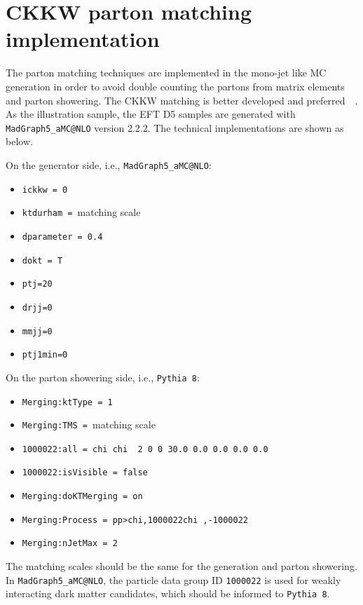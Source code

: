
\section{CKKW parton matching implementation}
\label{sec:monojet_parton_match}

The parton matching techniques are implemented in the mono-jet like MC generation in order to avoid double counting the partons from matrix elements and parton showering. The CKKW matching is better developed and preferred~\cite{Alwall:1405.0301}~\cite{Alwall:0706.2569}. As the illustration sample, the EFT D5 samples are generated with \texttt{MadGraph5\_aMC@NLO} version 2.2.2. The technical implementations are shown as below.

On the generator side, i.e., \texttt{MadGraph5\_aMC@NLO}:
\begin{itemize}
\item \texttt{ickkw = 0}
\item \texttt{ktdurham = }matching scale
\item \texttt{dparameter = 0.4}
\item \texttt{dokt = T}
\item \texttt{ptj=20}
\item \texttt{drjj=0}
\item \texttt{mmjj=0}
\item \texttt{ptj1min=0}
\end{itemize}
On the parton showering side, i.e., \texttt{Pythia 8}:
\begin{itemize}
\item \texttt{Merging:ktType           = 1}
\item \texttt{Merging:TMS              = }matching scale
\item \texttt{1000022:all = chi chi~ 2 0 0 30.0 0.0 0.0 0.0 0.0}
\item \texttt{1000022:isVisible = false}
\item \texttt{Merging:doKTMerging      = on}
\item \texttt{Merging:Process          = pp>{chi,1000022}{chi~,-1000022}}
\item \texttt{Merging:nJetMax          = 2}
\end{itemize}
The matching scales should be the same for the generation and parton showering. In \texttt{MadGraph5\_aMC@NLO}, the particle data group ID \texttt{1000022} is used for weakly interacting dark matter candidates, which should be informed to \texttt{Pythia 8}. 

